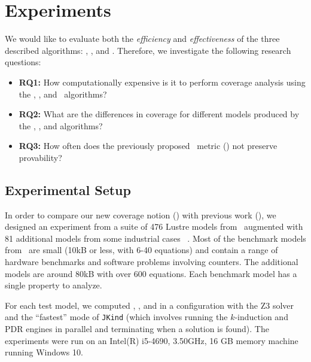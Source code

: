 \section{Experiments}
\label{sec:experiments}

We would like to evaluate both the {\em efficiency} and {\em
  effectiveness} of the three described algorithms: \ucalg, \ucbfalg, and \mustalg. Therefore, we investigate the following research questions:
\begin{itemize}
    \item \textbf{RQ1:} How computationally expensive is it to perform coverage analysis using the \ucalg, \ucbfalg, and \mustalg\ algorithms?
    \item \textbf{RQ2:} What are the differences in coverage for different models produced by the \ucalg, \ucbfalg, and \mustalg algorithms?
    \item \textbf{RQ3:} How often does the previously proposed \nondetcov\ metric (\mustalg) not preserve provability?
\end{itemize}

\subsection{Experimental Setup}

In order to compare our new coverage notion (\ivccov) with previous work (\nondetcovalt), we designed an experiment from a suite of 476 Lustre models from~\cite{Hagen08:FMCAD} augmented
with 81 additional models from some industrial cases ~\cite{QFCS15:backes,hilt2013}. Most of
the benchmark models from~\cite{Hagen08:FMCAD} are small (10kB or less,
with 6-40 equations) and contain a range of hardware benchmarks and
software problems involving counters. The additional models are around 80kB with over 600 equations. Each benchmark model has a single property to analyze.

For each test model, we computed \ucalg, \ucbfalg, and \mustalg in a configuration with
the Z3 solver and the ``fastest'' mode of \texttt{JKind} (which involves running the $k$-induction and PDR engines
in parallel and terminating when a solution is found). The experiments were run on an
Intel(R) i5-4690, 3.50GHz, 16 GB memory machine running Windows 10.




